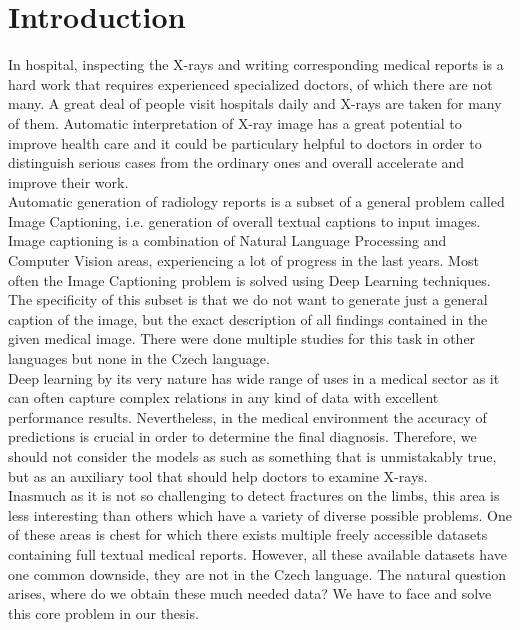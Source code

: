 \chapter*{Introduction}

In hospital, inspecting the X-rays and writing corresponding medical reports is a hard work that requires experienced specialized doctors, of which there are not many. A great deal of people visit hospitals daily and X-rays are taken for many of them. Automatic interpretation of X-ray image has a great potential to improve health care and it could be particulary helpful to doctors in order to distinguish serious cases from the ordinary ones and overall accelerate and improve their work.\\

Automatic generation of radiology reports is a subset of a general problem called Image Captioning, i.e. generation of overall textual captions to input images. Image captioning is a combination of Natural Language Processing and Computer Vision areas, experiencing a lot of progress in the last years. Most often the Image Captioning problem is solved using Deep Learning techniques. The specificity of this subset is that we do not want to generate just a general caption of the image, but the exact description of all findings contained in the given medical image. There were done multiple studies for this task in other languages but none in the Czech language.\\

Deep learning by its very nature has wide range of uses in a medical sector as it can often capture complex relations in any kind of data with excellent performance results. Nevertheless, in the medical environment the accuracy of predictions is crucial in order to determine the final diagnosis. Therefore, we should not consider the models as such as something that is unmistakably true, but as an auxiliary tool that should help doctors to examine X-rays.\\

Inasmuch as it is not so challenging to detect fractures on the limbs, this area is less interesting than others which have a variety of diverse possible problems. One of these areas is chest for which there exists multiple freely accessible datasets containing full textual medical reports. However, all these available datasets have one common downside, they are not in the Czech language. The natural question arises, where do we obtain these much needed data? We have to face and solve this core problem in our thesis.\\

